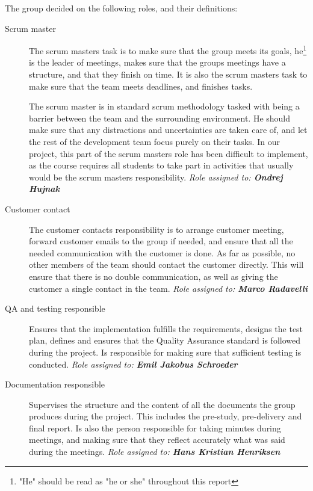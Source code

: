 \documentclass[11pt,a4paper,titlepage,oneside]{report}
\begin{document}
The group decided on the following roles, and their definitions:
\begin{description}
\item[Scrum master] The scrum masters task is to make sure that the group meets its goals, he\footnote{"He" should be read as "he or she" throughout this report} is the leader of meetings, makes sure that the groups meetings have a structure, and that they finish on time. It is also the scrum masters task to make sure that the team meets deadlines, and finishes tasks. 

The scrum master is in standard scrum methodology tasked with being a barrier between the team and the surrounding environment. He should make sure that any distractions and uncertainties are taken care of, and let the rest of the development team focus purely on their tasks. In our project, this part of the scrum masters role has been difficult to implement, as the course requires all students to take part in activities that usually would be the scrum masters responsibility. 
\emph{Role assigned to: \textbf{Ondrej Hujnak}}

\item[Customer contact] The customer contacts responsibility is to arrange customer meeting, forward customer emails to the group if needed, and ensure that all the needed communication with the customer is done. As far as possible, no other members of the team should contact the customer directly. This will ensure that there is no double communication, as well as giving the customer a single contact in the team.
\emph{Role assigned to: \textbf{Marco Radavelli}}

\item[\gls{QA} and testing responsible] Ensures that the implementation fulfills the requirements, designs the test plan, defines and ensures that the Quality Assurance standard is followed during the project. Is responsible for making sure that sufficient testing is conducted.
\emph{Role assigned to: \textbf{Emil Jakobus Schroeder}}

\item[Documentation responsible] Supervises the structure and the content of all the documents the group produces during the project. This includes the \gls{pre-study}, \gls{pre-delivery} and final report. Is also the person responsible for taking minutes during meetings, and making sure that they reflect accurately what was said during the meetings.
\emph{Role assigned to: \textbf{Hans Kristian Henriksen}}


\end{description}
\end{document}

